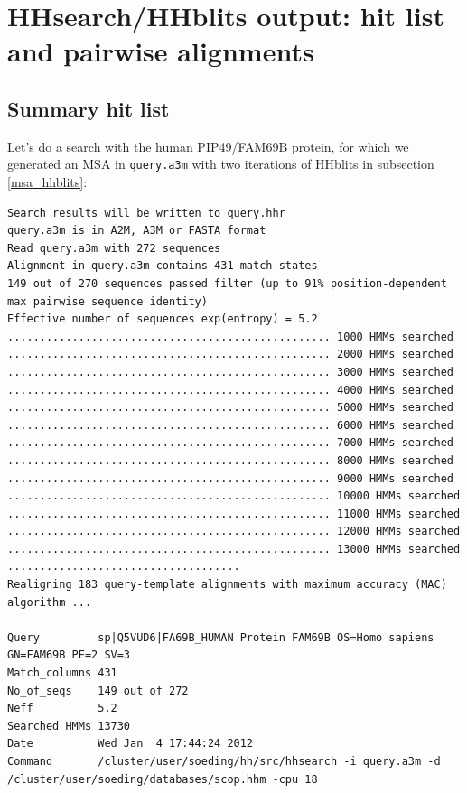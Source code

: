 \documentclass[11pt,a4paper]{article}
\begin{document}
\section{HHsearch/HHblits output: hit list and pairwise alignments}

\subsection{Summary hit list}

Let's do a search with the human PIP49/FAM69B protein, for which we generated an MSA in \verb`query.a3m` with two iterations of HHblits in subsection \ref{msa_hhblits}:

\scriptsize
\begin{verbatim}
Search results will be written to query.hhr
query.a3m is in A2M, A3M or FASTA format
Read query.a3m with 272 sequences
Alignment in query.a3m contains 431 match states
149 out of 270 sequences passed filter (up to 91% position-dependent max pairwise sequence identity)
Effective number of sequences exp(entropy) = 5.2 
.................................................. 1000 HMMs searched
.................................................. 2000 HMMs searched
.................................................. 3000 HMMs searched
.................................................. 4000 HMMs searched
.................................................. 5000 HMMs searched
.................................................. 6000 HMMs searched
.................................................. 7000 HMMs searched
.................................................. 8000 HMMs searched
.................................................. 9000 HMMs searched
.................................................. 10000 HMMs searched
.................................................. 11000 HMMs searched
.................................................. 12000 HMMs searched
.................................................. 13000 HMMs searched
....................................
Realigning 183 query-template alignments with maximum accuracy (MAC) algorithm ...

Query         sp|Q5VUD6|FA69B_HUMAN Protein FAM69B OS=Homo sapiens GN=FAM69B PE=2 SV=3
Match_columns 431
No_of_seqs    149 out of 272
Neff          5.2 
Searched_HMMs 13730
Date          Wed Jan  4 17:44:24 2012
Command       /cluster/user/soeding/hh/src/hhsearch -i query.a3m -d /cluster/user/soeding/databases/scop.hhm -cpu 18 


\end{verbatim}
\end{document}
